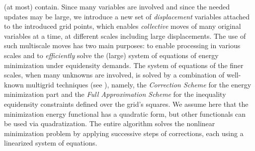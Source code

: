 \documentclass[final]{siamltex}
\begin{document}
(at most) contain. Since many variables are involved and since the
needed updates may be large, we introduce a new set of {\it
displacement} variables attached to the introduced grid points,
which enables {\it collective} moves of many original variables at
a time, at different scales including large displacements. The use
of such multiscale moves has two main purposes: to enable processing in various scales and to {\it efficiently} solve the (large) system of equations of energy
minimization under equidensity demands. The system of equations of
the finer scales, when many unknowns are involved, is solved by a
combination of well-known multigrid techniques (see
\cite{Brandt:1977:MLAa,vlsicad,mgbooktrott}), namely, the {\it
Correction Scheme} for the energy minimization part and the {\it
Full Approximation Scheme} for the inequality equidensity
constraints defined over the grid's squares. We assume here that
the minimization energy functional has a quadratic form, but other
functionals can be used via quadratization. The entire algorithm
solves the nonlinear minimization problem by applying successive
steps of corrections, each using a linearized system of
equations.
\end{document}
